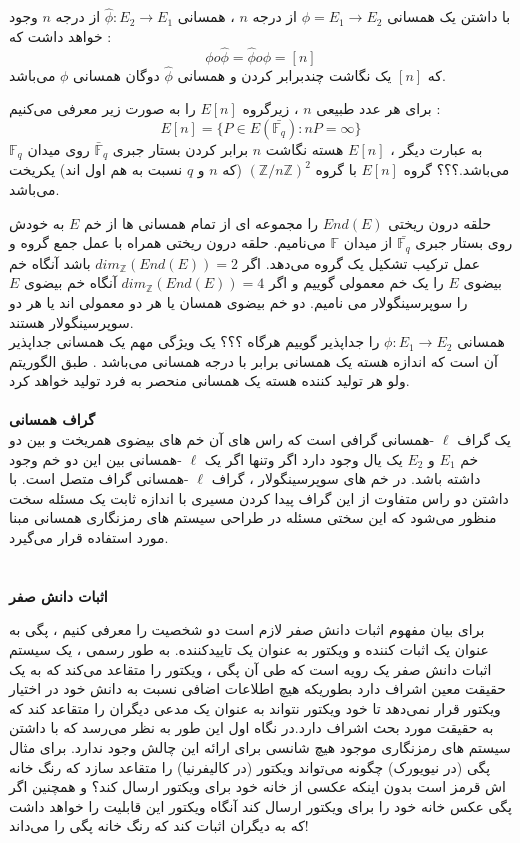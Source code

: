 \documentclass[12pt,a4paper]{article}
\begin{document}
با داشتن یک همسانی 
$\phi = E_1 \rightarrow E_2$
 از درجه 
 $n$
 ، همسانی 
 $\hat{\phi} : E_2 \rightarrow E_1$
 از درجه
 $n$
 وجود خواهد داشت که :
 $$\phi o \hat{\phi} = \hat{\phi} o \phi = [n]$$
که 
 $[n]$
 یک نگاشت چندبرابر کردن و همسانی
 $\hat{\phi}$
 دوگان همسانی
 $\phi$
 می‌باشد.
 
 
 برای هر عدد طبیعی 
 $n$
 ، زیرگروه 
 $E[n]$
 را به صورت زیر معرفی می‌کنیم :
 $$ E[n] = \{ P \in E(\bar{\mathbb{F}_{q}})  : nP = \infty \} $$
به عبارت دیگر ، 
$E[n]$
 هسته نگاشت 
 $n$
 برابر کردن بستار جبری 
 $\bar{\mathbb{F}}_q$
 	روی میدان 
$\mathbb{F}_q$
 	می‌باشد.؟؟؟
گروه
$E[n]$
با گروه
$(\mathbb{Z} / n\mathbb{Z})^2$
(که 
$n$
و
$q$
نسبت به هم اول اند) یکریخت می‌باشد.


حلقه درون ریختی 
$End(E)$
را مجموعه ای از تمام همسانی ها از خم
$E$
 به خودش روی بستار جبری 
 $\bar{\mathbb{F}_q}$
 از میدان
 $\mathbb{F}$
 می‌نامیم.
 حلقه درون ریختی همراه با عمل جمع گروه  و عمل ترکیب تشکیل یک گروه می‌دهد. اگر
 $dim_{\mathbb{Z}}(End(E)) = 2 $
 باشد آنگاه خم بیضوی
 $E$
 را یک خم معمولی گوییم و اگر 
  $dim_{\mathbb{Z}}(End(E)) = 4 $
  آنگاه خم بیضوی 
  $E$
  را سوپرسینگولار می نامیم.
  دو خم بیضوی همسان یا هر دو معمولی اند یا هر دو سوپرسینگولار هستند.
\\

همسانی 
$\phi : E_1 \rightarrow E_2$
را جداپذیر گوییم هرگاه ؟؟؟  
یک ویژگی مهم یک همسانی جداپذیر آن است که اندازه هسته یک همسانی برابر با درجه همسانی می‌باشد . طبق الگوریتم ولو هر تولید کننده هسته یک همسانی منحصر به فرد تولید خواهد کرد.
\\
\\
\textbf{گراف همسانی}
\\
یک گراف
$\ell$
-همسانی گرافی است که راس های آن خم های بیضوی همریخت و بین دو خم 
$E_1$
و
$E_2$ 
یک یال وجود دارد اگر وتنها اگر یک 
$\ell$
-همسانی بین این دو خم وجود داشته باشد. در خم های سوپرسینگولار ، گراف 
$\ell$
-همسانی گراف متصل است. با داشتن دو راس متفاوت از این گراف پیدا کردن مسیری با اندازه ثابت یک مسئله سخت منظور می‌شود که این سختی مسئله در طراحی سیستم های رمزنگاری همسانی مبنا مورد استفاده قرار می‌گیرد.
\\
\\
\\
\textbf{اثبات دانش صفر}


برای بیان مفهوم اثبات دانش صفر لازم است دو شخصیت را معرفی کنیم ، پگی 
به عنوان یک اثبات کننده 
و ویکتور
 به عنوان یک تاییدکننده.
  به طور رسمی ، یک سیستم اثبات دانش صفر یک رویه است که طی آن پگی  ، ویکتور را متقاعد می‌کند که به یک حقیقت معین اشراف دارد  بطوریکه هیچ اطلاعات اضافی نسبت به دانش خود در اختیار ویکتور قرار نمی‌دهد تا خود ویکتور نتواند به عنوان یک مدعی دیگران را متقاعد کند که به حقیقت مورد بحث اشراف دارد.در نگاه اول این طور به نظر می‌رسد که با داشتن سیستم های رمزنگاری موجود هیچ شانسی برای ارائه این چالش وجود ندارد. برای مثال پگی (در نیویورک) چگونه می‌تواند ویکتور (در کالیفرنیا) را متقاعد سازد که رنگ خانه اش قرمز است بدون اینکه عکسی از خانه خود برای ویکتور ارسال کند؟ و همچنین اگر پگی عکس خانه خود را برای ویکتور ارسال کند آنگاه ویکتور این قابلیت را خواهد داشت که به دیگران اثبات کند که رنگ خانه پگی را می‌داند!
\end{document}
